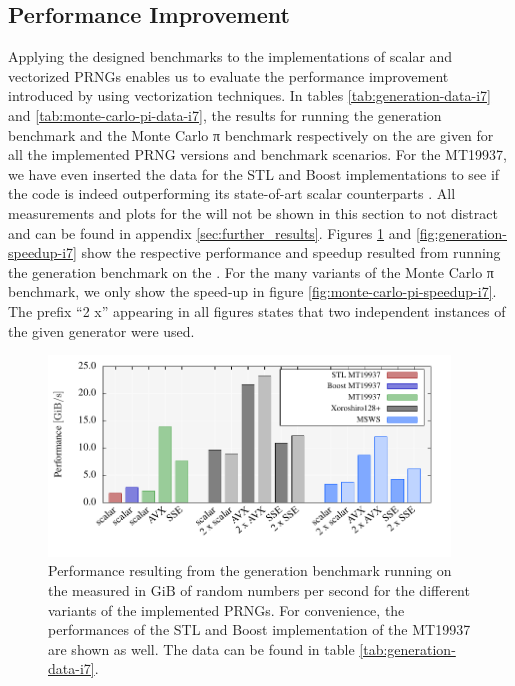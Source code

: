\documentclass{stdlocal}
\begin{document}
  \subsection{Performance Improvement} %
  \label{sub:performance_improvement}
    Applying the designed benchmarks to the implementations of scalar and vectorized PRNGs enables us to evaluate the performance improvement introduced by using vectorization techniques.
    In tables \ref{tab:generation-data-i7} and \ref{tab:monte-carlo-pi-data-i7}, the results for running the generation benchmark and the Monte Carlo π benchmark respectively on the  are given for all the implemented PRNG versions and benchmark scenarios.
    For the MT19937, we have even inserted the data for the STL and Boost implementations to see if the code is indeed outperforming its state-of-art scalar counterparts \autocite{boost,gcc-libstdcpp}.
    All measurements and plots for the  will not be shown in this section to not distract and can be found in appendix \ref{sec:further_results}.
    Figures \ref{fig:generation-performance-i7} and \ref{fig:generation-speedup-i7} show the respective performance and speedup resulted from running the generation benchmark on the .
    For the many variants of the Monte Carlo π benchmark, we only show the speed-up in figure \ref{fig:monte-carlo-pi-speedup-i7}.
    The prefix \enquote{2 x} appearing in all figures states that two independent instances of the given generator were used.

    \begin{figure}
      \center
      \includegraphics[width=0.95\textwidth]{plots/generation_desktop.pdf}
      \caption[Generation Benchmark Performance for ]{%
        Performance resulting from the generation benchmark running on the  measured in $\mathrm{GiB}$ of random numbers per second for the different variants of the implemented PRNGs.
        For convenience, the performances of the STL and Boost implementation of the MT19937 are shown as well.
        The data can be found in table \ref{tab:generation-data-i7}.
      }
      \label{fig:generation-performance-i7}
    \end{figure}
\end{document}
